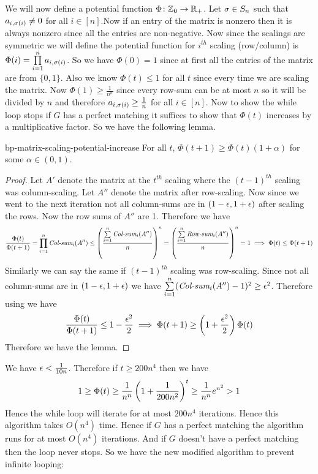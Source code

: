 We will now define a potential function $\Phi\colon \mathbb{Z}_0\to \mathbb{R}_+$. Let $\sigma\in S_n$ such that $a_{i,\sigma(i)}\neq 0$ for all $i\in[n]$.Now if an entry of the matrix is nonzero then it is always nonzero since all the entries are non-negative. Now since the scalings are symmetric we will define the potential function for $i^{th}$ scaling (row/column) is $\Phi(i)=\prod\limits_{i=1}^n a_{i,\sigma(i)}$. So we have $\Phi(0)=1$ since at first all the entries of the matrix are from $\{0,1\}$. Also we know $\Phi(t)\leq 1$ for all $t$ since every time we are scaling the matrix. Now $\Phi(1)\geq \frac1{n^n}$ since every row-sum can be at most $n$ so it will be divided by $n$ and therefore $a_{i,\sigma(i)}\geq \frac1n$ for all $i\in[n]$. Now to show the while loop stops if $G$ has a perfect matching it suffices to show that $\Phi(t)$ increases by a multiplicative factor. So we have the following lemma.
\begin{lemma}{}{bp-matrix-scaling-potential-increase}
For all $t$, 	$\Phi(t+1)\geq \Phi(t)(1+\alpha)$ for some $\alpha\in (0,1)$. 
\end{lemma}
\begin{proof}
	Let $A'$ denote the matrix at the $t^{th}$ scaling where the $(t-1)^{th}$ scaling was column-scaling. Let $A''$ denote the matrix after row-scaling. Now since we went to the next iteration not all column-sums are in $(1-\epsilon, 1+\epsilon)$ after scaling the rows. Now the row sums of $A''$ are 1. Therefore we have $$\frac{\Phi(t)}{\Phi(t+1)}= \prod_{i=1}^n\textit{Col-sum}_i(A'')\leq \left(\frac{\sum\limits_{i=1}^n \textit{Col-sum}_i(A'')}n\right)^n=\left(\frac{\sum\limits_{i=1}^n \textit{Row-sum}_i(A'')}n\right)^n=1\implies \Phi(t)\leq \Phi(t+1)$$Similarly we can say the same if $(t-1)^{th}$ scaling was row-scaling. Since  not all column-sums are in $(1-\epsilon, 1+\epsilon)$ we have $\sum\limits_{i=1}^n(\textit{Col-sum}_i(A'')-1)^2\geq \epsilon^2$. Therefore using  we have $$\frac{\Phi(t)}{\Phi(t+1)}\leq 1-\frac{\epsilon^2}{2}\implies\Phi(t+1)\geq \left(1+\frac{\epsilon^2}2\right)\Phi(t)$$Therefore we have the lemma. 
\end{proof}

We have $\epsilon<\frac1{10n}$. Therefore if $t\geq 200n^4$ then we have $$1\geq \Phi(t)\geq \frac1{n^n}\left(1+\frac1{200n^2}\right)^t\geq \frac1{n^n}e^{n^2}>1$$Hence the while loop will iterate for at most $200n^4$ iterations. Hence this algorithm takes $O(n^4)$ time. Hence if $G$ has a perfect matching the algorithm runs for at most $O(n^4)$ iterations. And if $G$ doesn't have a perfect matching then the loop never stops. So we have the new modified algorithm to prevent infinite looping:

